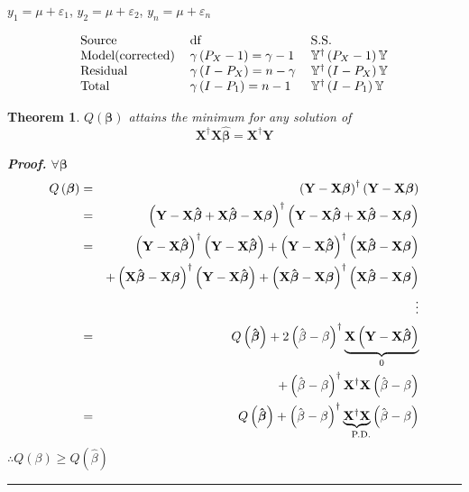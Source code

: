 \documentclass{article}
\newtheorem{theorem}{Theorem}
\newenvironment{proof}[1][Proof]{\noindent\textbf{#1.} }{\ \rule{0.5em}{0.5em}}
\begin{document}
\bigskip

$y_{1}=\mu +\varepsilon _{1}$, $y_{2}=\mu +\varepsilon _{2}$, $y_{n}=\mu
+\varepsilon _{n}$

\begin{equation*}
\begin{tabular}{lll}
Source & df & S.S. \\ 
Model(corrected) & $\gamma \left( P_{X}-1\right) =\gamma -1$ & $\mathbb{Y}%
^{\dagger }\left( P_{X}-1\right) \mathbb{Y}$ \\ 
Residual & $\gamma \left( I-P_{X}\right) =n-\gamma $ & $\mathbb{Y}^{\dagger
}\left( I-P_{X}\right) \mathbb{Y}$ \\ 
Total & $\gamma \left( I-P_{1}\right) =n-1$ & $\mathbb{Y}^{\dagger }\left(
I-P_{1}\right) \mathbb{Y}$%
\end{tabular}%
\end{equation*}

\begin{theorem}
$Q\left( \mathbf{\beta }\right) $ attains the minimum for any solution of%
\begin{equation*}
\mathbf{X}^{\dagger }\mathbf{X\hat{\beta}}=\mathbf{X}^{\mathbb{\dagger }}%
\mathbf{Y}
\end{equation*}

\begin{proof}
$\forall \mathbf{\beta }$%
\begin{eqnarray*}
Q\left( \mathbf{\beta }\right)  &=&\left( \mathbf{Y-X\beta }\right)
^{\dagger }\left( \mathbf{Y-X\beta }\right)  \\
&=&\left( \mathbf{Y-X\hat{\beta}+X\hat{\beta}-X\beta }\right) ^{\dagger
}\left( \mathbf{Y-X\hat{\beta}+X\hat{\beta}-X\beta }\right)  \\
&=&\left( \mathbf{Y-X\hat{\beta}}\right) ^{\dagger }\left( \mathbf{Y-X\hat{%
\beta}}\right) +\left( \mathbf{Y-X\hat{\beta}}\right) ^{\dagger }\left( 
\mathbf{X\hat{\beta}-X\beta }\right)  \\
&&+\left( \mathbf{X\hat{\beta}-X\beta }\right) ^{\dagger }\left( \mathbf{Y-X%
\hat{\beta}}\right) +\left( \mathbf{X\hat{\beta}-X\beta }\right) ^{\dagger
}\left( \mathbf{X\hat{\beta}-X\beta }\right)  \\
&&\vdots  \\
&=&Q\left( \mathbf{\hat{\beta}}\right) +2\left( \hat{\beta}-\beta \right)
^{\dagger }\underset{0}{\underbrace{\mathbf{X}\left( \mathbf{Y-X\hat{\beta}}%
\right) }} \\
&&+\left( \hat{\beta}-\beta \right) ^{\dagger }\mathbf{X}^{\dagger }\mathbf{X%
}\left( \hat{\beta}-\beta \right)  \\
&=&Q\left( \mathbf{\hat{\beta}}\right) +\left( \hat{\beta}-\beta \right)
^{\dagger }\underset{\text{P.D.}}{\underbrace{\mathbf{X}^{\dagger }\mathbf{X}%
}}\left( \hat{\beta}-\beta \right) 
\end{eqnarray*}%
$\therefore Q\left( \beta \right) \geq Q\left( \hat{\beta}\right) $
\end{proof}
\end{theorem}
\end{document}

